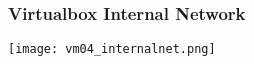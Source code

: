 \begin{frame}
\frametitle{Virtualbox Internal Network}
    \center\texttt{[image: vm04\_internalnet.png]}
\end{frame}
